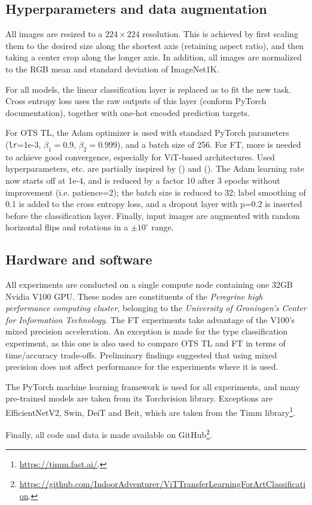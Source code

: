 \subsection{Hyperparameters and data augmentation}
All images are resized to a $224 \times 224$ resolution. This is achieved by first scaling them to the desired size along the shortest axis (retaining aspect ratio), and then taking a center crop along the longer axis. In addition, all images are normalized to the RGB mean and standard deviation of ImageNet1K.

For all models, the linear classification layer is replaced as to fit the new task. Cross entropy loss uses the raw outputs of this layer (conform PyTorch documentation), together with one-hot encoded prediction targets.

For OTS TL, the Adam optimizer is used with standard PyTorch parameters (\texttt{lr}=1e-3, $\beta_1=0.9$, $\beta_2=0.999$), and a batch size of 256. For FT, more is needed to achieve good convergence, especially for ViT-based architectures. Used hyperparameters, etc. are partially inspired by \citeauthor{matsoukas2021time} (\citeyear{matsoukas2021time}) and \citeauthor{zhou2021convnets} (\citeyear{zhou2021convnets}). The Adam learning rate now starts off at 1e-4, and is reduced by a factor 10 after 3 epochs without improvement (i.e. patience=2); the batch size is reduced to 32; label smoothing of 0.1 is added to the cross entropy loss, and a dropout layer with p=0.2 is inserted before the classification layer. Finally, input images are augmented with random horizontal flips and rotations in a $\pm 10 ^\circ$ range.

\subsection{Hardware and software}
All experiments are conducted on a single compute node containing one 32GB Nvidia V100 GPU. These nodes are constituents of the \textit{Peregrine high performance computing cluster}, belonging to the \textit{University of Groningen's Center for Information Technology}. The FT experiments take advantage of the V100's mixed precision acceleration. An exception is made for the type classification experiment, as this one is also used to compare OTS TL and FT in terms of time/accuracy trade-offs. Preliminary findings suggested that using mixed precision does not affect performance for the experiments where it is used.

The PyTorch machine learning framework is used for all experiments, and many pre-trained models are taken from its Torchvision library. Exceptions are EfficientNetV2, Swin, DeiT and Beit, which are taken from the Timm library\footnote{\url{https://timm.fast.ai/}.}.

Finally, all code and data is made available on GitHub\footnote{\url{https://github.com/IndoorAdventurer/ViTTransferLearningForArtClassification}.}.


